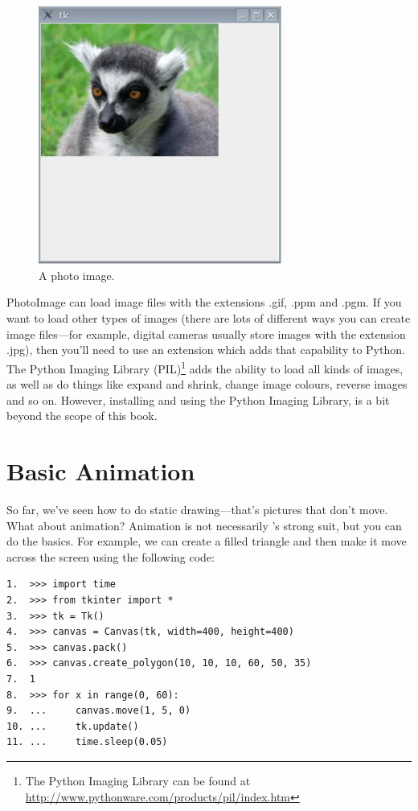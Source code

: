 \begin{figure}
\begin{center}
\includegraphics[width=80mm]{images/figure43}
\end{center}
\caption{A photo image.}\label{fig43}
\end{figure}

PhotoImage can load image files with the extensions .gif, .ppm and .pgm. If you want to load other types of images (there are lots of different ways you can create image files---for example, digital cameras usually store images with the extension .jpg), then you'll need to use an extension which adds that capability to Python. The Python Imaging Library (PIL)\footnote{The Python Imaging Library can be found at \href{http://www.pythonware.com/products/pil/index.htm}{http://www.pythonware.com/products/pil/index.htm}} adds the ability to load all kinds of images, as well as do things like expand and shrink, change image colours, reverse images and so on. However, installing and using the Python Imaging Library, is a bit beyond the scope of this book.

\section{Basic Animation}

So far, we've seen how to do static drawing---that's pictures that don't move. What about animation? Animation is not necessarily 's strong suit, but you can do the basics. For example, we can create a filled triangle and then make it move across the screen using the following code:

\begin{Verbatim}[frame=single]
1.  >>> import time
2.  >>> from tkinter import *
3.  >>> tk = Tk()
4.  >>> canvas = Canvas(tk, width=400, height=400)
5.  >>> canvas.pack()
6.  >>> canvas.create_polygon(10, 10, 10, 60, 50, 35)
7.  1
8.  >>> for x in range(0, 60):
9.  ...     canvas.move(1, 5, 0)
10. ...     tk.update()
11. ...     time.sleep(0.05)
\end{Verbatim}

